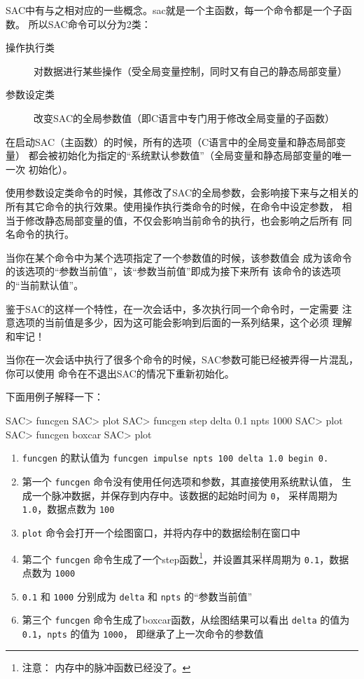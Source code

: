 SAC中有与之相对应的一些概念。sac就是一个主函数，每一个命令都是一个子函数。
所以SAC命令可以分为2类：
\begin{description}
\item[操作执行类] 对数据进行某些操作（受全局变量控制，同时又有自己的静态局部变量）
\item[参数设定类] 改变SAC的全局参数值（即C语言中专门用于修改全局变量的子函数）
\end{description}

在启动SAC（主函数）的时候，所有的选项（C语言中的全局变量和静态局部变量）
都会被初始化为指定的``系统默认参数值''（全局变量和静态局部变量的唯一一次
初始化）。

使用参数设定类命令的时候，其修改了SAC的全局参数，会影响接下来与之相关的
所有其它命令的执行效果。使用操作执行类命令的时候，在命令中设定参数，
相当于修改静态局部变量的值，不仅会影响当前命令的执行，也会影响之后所有
同名命令的执行。

当你在某个命令中为某个选项指定了一个参数值的时候，该参数值会
成为该命令的该选项的``参数当前值''，该``参数当前值''即成为接下来所有
该命令的该选项的``当前默认值''。

鉴于SAC的这样一个特性，在一次会话中，多次执行同一个命令时，一定需要
注意选项的当前值是多少，因为这可能会影响到后面的一系列结果，这个必须
理解和牢记！

\begin{note}
当你在一次会话中执行了很多个命令的时候，SAC参数可能已经被弄得一片混乱，
你可以使用  命令在不退出SAC的情况下重新初始化。
\end{note}

下面用例子解释一下：
\begin{SACCode}
SAC> funcgen
SAC> plot
SAC> funcgen step delta 0.1 npts 1000
SAC> plot
SAC> funcgen boxcar
SAC> plot
\end{SACCode}

\begin{enumerate}
\item \texttt{funcgen} 的默认值为 \texttt{funcgen impulse npts 100 delta 1.0 begin 0.}
\item 第一个 \texttt{funcgen} 命令没有使用任何选项和参数，其直接使用系统默认值，
    生成一个脉冲数据，并保存到内存中。该数据的起始时间为 \texttt{0}，
    采样周期为 \texttt{1.0}，数据点数为 \texttt{100}
\item \texttt{plot} 命令会打开一个绘图窗口，并将内存中的数据绘制在窗口中
\item 第二个 \texttt{funcgen} 命令生成了一个step函数\footnote{注意：
    内存中的脉冲函数已经没了。}，并设置其采样周期为 \texttt{0.1}，数据
    点数为 \texttt{1000}
\item \texttt{0.1} 和 \texttt{1000} 分别成为 \texttt{delta} 和
    \texttt{npts} 的``参数当前值''
\item 第三个 \texttt{funcgen} 命令生成了boxcar函数，从绘图结果可以看出
    \texttt{delta} 的值为 \texttt{0.1}，\texttt{npts} 的值为 \texttt{1000}，
    即继承了上一次命令的参数值
\end{enumerate}
